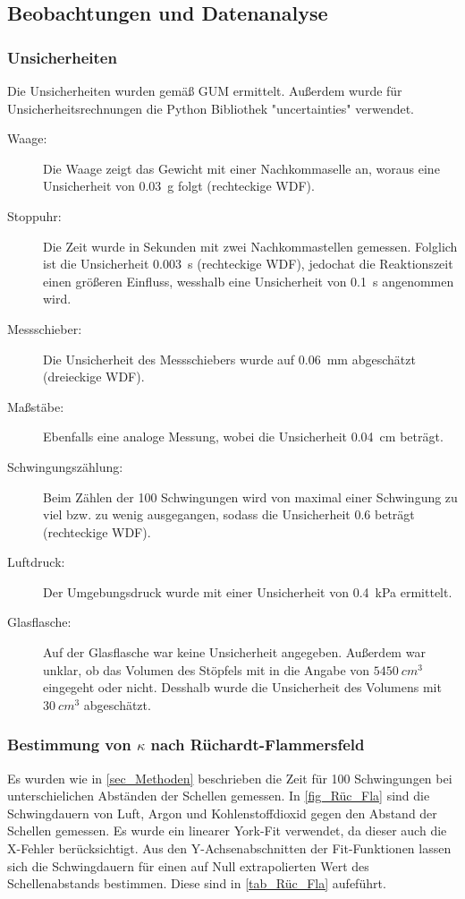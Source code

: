 \documentclass[
	a4paper,
	12pt,
	pagesize,
	ngerman
]{scrartcl}
\begin{document}
	\subsection{Beobachtungen und Datenanalyse}
	\subsubsection{Unsicherheiten} %
	Die Unsicherheiten wurden gemäß GUM ermittelt. 
	Außerdem wurde für Unsicherheitsrechnungen die Python Bibliothek "uncertainties" verwendet.
	\begin{description}
		\item[Waage:] Die Waage zeigt das Gewicht mit einer Nachkommaselle an, woraus eine Unsicherheit von \SI{0,03}{g} folgt (rechteckige WDF).
		\item[Stoppuhr:] Die Zeit wurde in Sekunden mit zwei Nachkommastellen gemessen. Folglich ist die Unsicherheit \SI{0,003}{s} (rechteckige WDF), jedochat die Reaktionszeit einen größeren Einfluss, wesshalb eine Unsicherheit von \SI{0,1}{s} angenommen wird.
		\item[Messschieber:] Die Unsicherheit des Messschiebers wurde auf \SI{0,06}{mm}  abgeschätzt (dreieckige WDF).
		\item[Maßstäbe:]  Ebenfalls eine analoge Messung, wobei die Unsicherheit \SI{0,04}{cm} beträgt.
		\item[Schwingungszählung:] Beim Zählen der 100 Schwingungen wird von maximal einer Schwingung zu viel bzw. zu wenig ausgegangen, sodass die Unsicherheit \SI{0,6}{} beträgt (rechteckige WDF).
		\item[Luftdruck:] Der Umgebungsdruck wurde mit einer Unsicherheit von \SI{0,4}{kPa} ermittelt.
		\item[Glasflasche:] Auf der Glasflasche war keine Unsicherheit angegeben. Außerdem war unklar, ob das Volumen des Stöpfels mit in die Angabe von $\SI{5450}{cm^3}$ eingegeht oder nicht. Desshalb wurde die Unsicherheit des Volumens mit $\SI{30}{cm^3}$ abgeschätzt.
	\end{description}
	
	\subsubsection{Bestimmung von $\kappa$ nach Rüchardt-Flammersfeld}
	Es wurden wie in \cref{sec_Methoden} beschrieben die Zeit für 100 Schwingungen bei unterschielichen Abständen der Schellen gemessen.
	In \cref{fig_Rüc_Fla} sind die Schwingdauern von Luft, Argon und Kohlenstoffdioxid gegen den Abstand der Schellen gemessen. 
	Es wurde ein linearer York-Fit verwendet, da dieser auch die X-Fehler berücksichtigt.
	Aus den Y-Achsenabschnitten der Fit-Funktionen lassen sich die Schwingdauern für einen auf Null extrapolierten Wert des Schellenabstands bestimmen.
	Diese sind in \cref{tab_Rüc_Fla} aufeführt.
	
\end{document}
